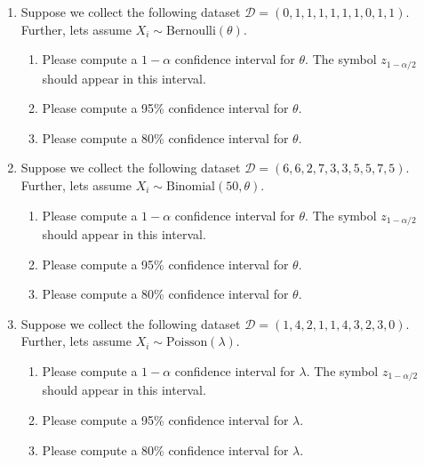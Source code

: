 \begin{enumerate}
    \item Suppose we collect the following dataset $\mathcal{D} = (0, 1, 1, 1, 1, 1, 1, 0, 1, 1)$. Further, lets assume $X_{i} \sim \text{Bernoulli}(\theta)$.
        \begin{enumerate}
            \item Please compute a $1-\alpha$ confidence interval for $\theta$. The symbol $z_{1-\alpha/2}$ should appear in this interval. 
            \item Please compute a 95\% confidence interval for $\theta$.
            \item Please compute a 80\% confidence interval for $\theta$.
        \end{enumerate}
        
    \item Suppose we collect the following dataset $\mathcal{D} = (6, 6, 2, 7, 3, 3, 5, 5, 7, 5)$. Further, lets assume $X_{i} \sim \text{Binomial}(50,\theta)$.
        \begin{enumerate}
            \item Please compute a $1-\alpha$ confidence interval for $\theta$. The symbol $z_{1-\alpha/2}$ should appear in this interval. 
            \item Please compute a 95\% confidence interval for $\theta$.
            \item Please compute a 80\% confidence interval for $\theta$.
        \end{enumerate}
        

    \item Suppose we collect the following dataset $\mathcal{D} = (1, 4, 2, 1, 1, 4, 3, 2, 3, 0)$. Further, lets assume $X_{i} \sim \text{Poisson}(\lambda)$.
        \begin{enumerate}
            \item Please compute a $1-\alpha$ confidence interval for $\lambda$. The symbol $z_{1-\alpha/2}$ should appear in this interval. 
            \item Please compute a 95\% confidence interval for $\lambda$.
            \item Please compute a 80\% confidence interval for $\lambda$.
        \end{enumerate}

\end{enumerate}